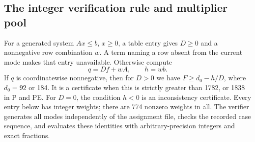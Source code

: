 \documentclass[11pt,a4paper]{article}
\theoremstyle{remark}
\begin{document}
\subsection{The integer verification rule and multiplier pool}
For a generated system $Ax\leq b$, $x\geq0$, a table entry gives $D\geq0$
and a nonnegative row combination $w$. A term naming a row absent from
the current mode makes that entry unavailable. Otherwise compute
\[
 q=Df+wA,\qquad h=wb.
\]
If $q$ is coordinatewise nonnegative, then for $D>0$ we have
$F\geq d_0-h/D$, where $d_0=92$ or 184. It is a certificate when this is
strictly greater than 1782, or 1838 in P and PE. For $D=0$, the condition
$h<0$ is an inconsistency certificate. Every entry below has integer
weights; there are 774 nonzero weights in all.
The verifier generates all modes independently of the assignment file,
checks the recorded case sequence, and evaluates these identities with
arbitrary-precision integers and exact fractions.
\end{document}
